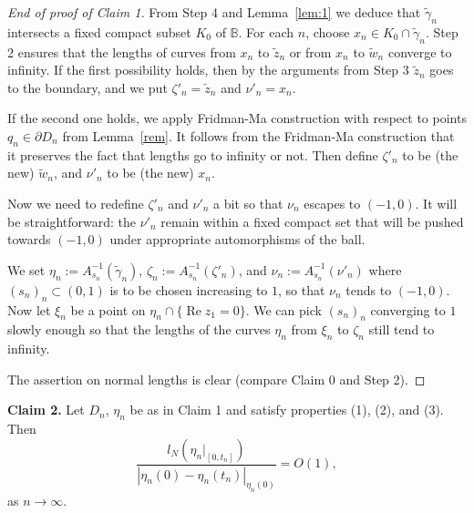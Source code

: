 \documentclass[a4paper,12pt]{amsart}
\def\re{\operatorname{Re}}
\theoremstyle{remark}\newtheorem{remark}[theorem]{Remark}
\begin{document}
\begin{proof}[End of proof of Claim 1]
From Step 4 and Lemma~\ref{lem:1} we deduce that $\tilde \gamma_n$ intersects a fixed compact subset $K_0$ of $\mathbb B$. For each $n$, choose  $x_n \in K_0 \cap \tilde \gamma_n$. Step 2 ensures that the lengths of curves from $x_n$ to $\tilde z_n$ or from $x_n$ to $\tilde w_n$ converge to infinity. If the first possibility holds, then by the arguments from Step 3 $\tilde z_n$ goes to the boundary, and we put $\zeta'_n=\tilde z_n$ and $\nu'_n=x_n$. 

If the second one holds, we apply Fridman-Ma construction with respect to points $q_n\in \partial D_n$ from Lemma~\ref{rem}. It follows  from the Fridman-Ma construction that it preserves the fact that
lengths go to infinity or not. Then define $\zeta'_n$ to be (the new) $\tilde w_n$, and $\nu'_n$ to be (the new) $x_n$. 

Now we need to redefine $\zeta'_n$  and $\nu'_n$ a bit so that $\nu_n$ escapes to $(-1,0)$. It will be straightforward: the $\nu'_n$ remain within a fixed compact set that will be pushed towards $(-1,0)$ under appropriate 
automorphisms of the ball.

We set $\eta_n:=A_{s_n}^{-1}(\tilde \gamma_n)$, $\zeta_n:=A_{s_n}^{-1}(\zeta'_n)$, 
and $\nu_n:=A_{s_n}^{-1}(\nu'_n)$ where $(s_n)_n\subset (0,1)$ is to be chosen
increasing to $1$, so that $\nu_n$ tends to $(-1,0)$. Now let $\xi_n$ be a point on $\eta_n \cap \{\re z_1 =0\}$. We can pick $(s_n)_n$ converging to $1$ slowly enough so that the lengths of the curves $\eta_n$ from $\xi_n$ to $\zeta_n$ still tend to infinity.

The assertion on normal lengths is clear (compare Claim 0 and Step 2). 
\end{proof}
 

\medskip

{\bf Claim 2.} Let $D_n$, $\eta_n$ be as in Claim 1 and satisfy properties (1), (2), and (3). Then 
\begin{equation}\label{eq:o1} \frac{l_N(\eta_n|_{[0,t_n]})}{| \eta_n(0)- \eta_n(t_n)|_{\eta_n(0)}} =O(1),
\end{equation}
as $n\to \infty$.
\end{document}

